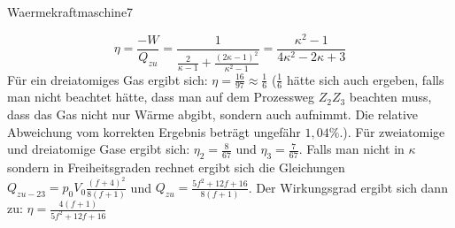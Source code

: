 \begin{problem}{Waermekraftmaschine}{7}
\begin{solution}
$$\eta=\frac{-W}{Q_{zu}}=\frac 1{\frac 2{\kappa - 1}+\frac{(2\kappa-1)^2}{\kappa^2-1}}=\frac{\kappa^2-1}{4\kappa^2-2\kappa+3}$$
Für ein dreiatomiges Gas ergibt sich: $\eta=\frac {16}{97}\approx \frac 16$ ($\frac 16$ hätte sich auch ergeben, falls man nicht beachtet hätte, dass man auf dem Prozessweg $Z_2Z_3$ beachten muss, dass das Gas nicht nur Wärme abgibt, sondern auch aufnimmt. Die relative Abweichung vom korrekten Ergebnis beträgt ungefähr $1,04\%$.).
Für zweiatomige und dreiatomige Gase ergibt sich: $\eta_2=\frac 8{67}$ und $\eta_3=\frac 7{67}$.
Falls man nicht in $\kappa$ sondern in Freiheitsgraden rechnet ergibt sich die Gleichungen $Q_{zu-23}=p_0V_0\frac{(f+4)^2}{8(f+1)}$ und $Q_{zu}=\frac{5f^2+12f+16}{8(f+1)}$. Der Wirkungsgrad ergibt sich dann zu: $\eta=\frac{4(f+1)}{5f^2+12f+16}$

\end{solution}
\end{problem}

